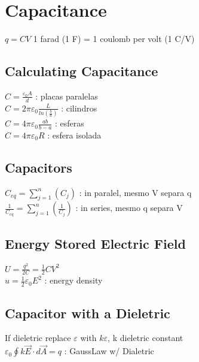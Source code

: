 \section*{Capacitance}
$q=CV$ 1 farad (1 F) = 1 coulomb per volt (1 C/V)\\
\subsection*{Calculating Capacitance}
$C=\frac{\varepsilon _0A}{d}$ : placas paralelas\\
$C=2\pi \varepsilon _0\frac{L}{ln\left(\frac{b}{a}\right)}$ : cilindros\\
$C=4\pi \varepsilon _0\frac{ab}{b-a}$ : esferas\\
$C=4\pi \varepsilon _0R$ : esfera isolada\\
\subsection*{Capacitors}
$C_{eq}=\sum _{j=1}^n\left(C_j\right)$ : in paralel, mesmo V separa q\\
$\frac{1}{C_{eq}}=\sum _{j=1}^n\left(\frac{1}{C_j}\right)$ : in series, mesmo q separa V\\
\subsection*{Energy Stored Electric Field}
$U=\frac{q^2}{2C}=\frac{1}{2}CV^2$\\
$u=\frac{1}{2}\varepsilon _0E^2$ : energy density\\
\subsection*{Capacitor with a Dieletric}
If dieletric replace $\varepsilon$ with $k\varepsilon$, k dieletric constant\\
$\varepsilon _0\oint k\vec{E}\cdot d\vec{A}=q$ : GaussLaw w/ Dialetric
